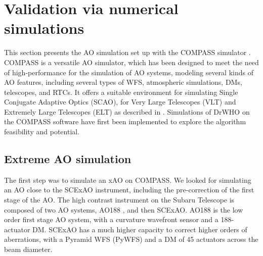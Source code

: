 \documentclass[twocolumn]{aa}
\begin{document}



\section{Validation via numerical simulations}\label{sec:compass}

This section presents the AO simulation set up with the COMPASS simulator \citep{Compass}.
COMPASS is a versatile AO simulator, which has been designed to meet the need of high-performance for the simulation of AO systems, modeling several kinds of AO features, including several types of WFS, atmospheric simulations, DMs, telescopes, and RTCs. It offers a suitable environment for simulating Single Conjugate Adaptive Optics (SCAO), for Very Large Telescopes (VLT) and Extremely Large Telescopes (ELT) as described in \citet{Vidal2018}.  Simulations of DrWHO on the COMPASS software have first been implemented to explore the algorithm feasibility and potential. 


\subsection{Extreme AO simulation}

The first step was to simulate an xAO on COMPASS. We looked for simulating an AO close to the SCExAO instrument, including the pre-correction of the first stage of the AO. The high contrast instrument on the Subaru Telescope is composed of two AO systems, AO188 \citep{AO188_minowa}, and then SCExAO. AO188 is the low order first stage AO system, with a curvature wavefront sensor and a 188-actuator DM. SCExAO has a much higher capacity to correct higher orders of aberrations, with a Pyramid WFS (PyWFS) and a DM of 45 actuators across the beam diameter. \\
\end{document}

